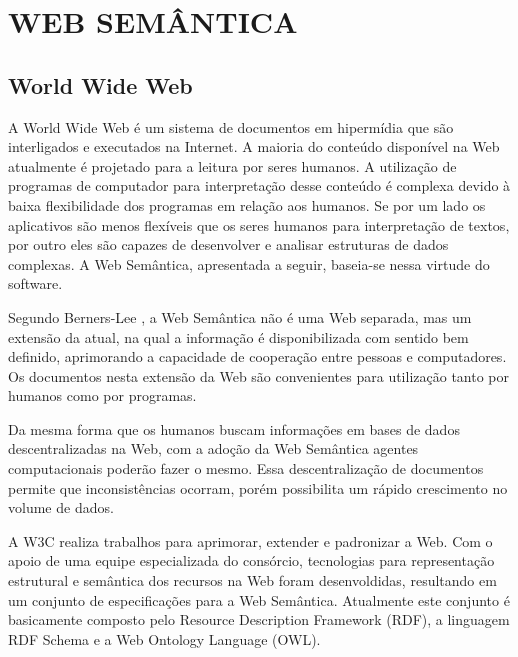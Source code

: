 \chapter{WEB SEMÂNTICA} %
\label{cha:web_semantica}

\section{World Wide Web} %
\label{sec:world_wide_web}

A World Wide Web é um sistema de documentos em hipermídia que são interligados e executados na Internet. A maioria do conteúdo disponível na Web atualmente é projetado para a leitura por seres humanos. A utilização de programas de computador para interpretação desse conteúdo é complexa devido à baixa flexibilidade dos programas em relação aos humanos. Se por um lado os aplicativos são menos flexíveis que os seres humanos para interpretação de textos, por outro eles são capazes de desenvolver e analisar estruturas de dados complexas. A Web Semântica, apresentada a seguir, baseia-se nessa virtude do software. 


Segundo Berners-Lee \cite{bemerslee2001sw}, a Web Semântica não é uma Web separada, mas um extensão da atual, na qual a informação é disponibilizada com sentido bem definido, aprimorando a capacidade de cooperação entre pessoas e computadores. Os documentos nesta extensão da Web são convenientes para utilização tanto por humanos como por programas.


Da mesma forma que os humanos buscam informações em bases de dados descentralizadas na Web, com a adoção da Web Semântica agentes computacionais poderão fazer o mesmo. Essa descentralização de documentos permite que inconsistências ocorram, porém possibilita um rápido crescimento no volume de dados.


A W3C realiza trabalhos para aprimorar, extender e padronizar a Web. Com o apoio de uma equipe especializada do consórcio, tecnologias para representação estrutural e semântica dos recursos na Web foram desenvoldidas, resultando em um conjunto de especificações para a Web Semântica. Atualmente este conjunto é basicamente composto pelo Resource Description Framework (RDF), a linguagem RDF Schema e a Web Ontology Language (OWL).

